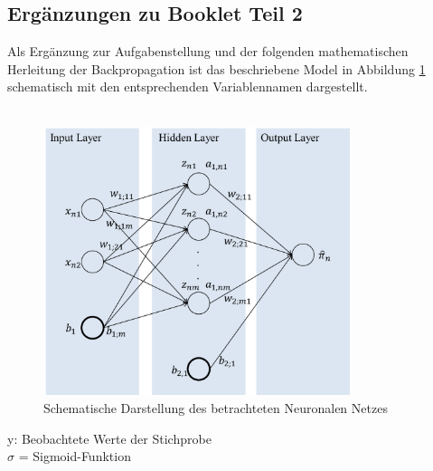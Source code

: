 \subsection{Ergänzungen zu Booklet Teil 2} \label{app:ergaenzung_booklet_2}
Als Ergänzung zur Aufgabenstellung und der folgenden mathematischen Herleitung der Backpropagation ist das beschriebene Model in Abbildung \ref{fig:nn_schema} schematisch mit den entsprechenden Variablennamen dargestellt.\\\\
\begin{figure}[ht]
	\centering
	\includegraphics[width = 0.8\textwidth]{Bilder/neuralNetwork.png}
	\caption{Schematische Darstellung des betrachteten Neuronalen Netzes}
	\label{fig:nn_schema}
\end{figure}
y: Beobachtete Werte der Stichprobe\\
$\sigma$ = Sigmoid-Funktion
